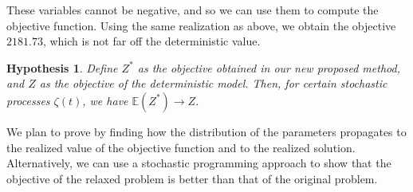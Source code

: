 \documentclass[11pt,a4paper,titlepage]{article}
\theoremstyle{definition}
\theoremstyle{plain}
\newtheorem{claim}{Hypothesis}
\begin{document}
    These variables cannot be negative,
    and so we can use them to compute the objective function.
    Using the same realization as above,
    we obtain the objective $2181.73$,
    which is not far off the deterministic value.

    \begin{claim}
        \label{claim:newmodel-converge}
        Define $Z^*$ as the objective obtained in our new proposed method,
        and $Z$ as the objective of the deterministic model.
        Then,
        for certain stochastic processes $\zeta(t)$,
        we have $\mathbb{E}(Z^*) \to Z$.
    \end{claim}

    We plan to prove  by  finding how the distribution of the parameters propagates to the realized value of the objective function and to the realized solution. Alternatively, we can use a stochastic programming approach to show that the objective of the relaxed problem is better than that of the original problem.

    \clearpage
    \printbibliography
    \label{sec:bibliography}
\end{document}
